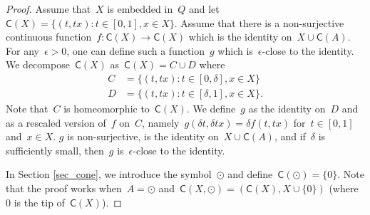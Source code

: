 \documentclass[english,11pt]{article}
\theoremstyle{plain}
\theoremstyle{remark}
\theoremstyle{definition}
\newcommand{\unit}{\odot}%
\newcommand{\C}[1]{\mathsf{C}(#1)}%
\begin{document}
\begin{proof}
Assume that~$X$ is embedded in~$Q$ and let~$\C{X}=\{(t,t x):t\in[0,1],x\in X\}$. Assume that there is a non-surjective continuous function~$f:\C{X}\to\C{X}$ which is the identity on~$X\cup\C{A}$. For any~$\epsilon>0$, one can define such a function~$g$ which is~$\epsilon$-close to the identity. We decompose~$\C{X}$ as~$\C{X}=C\cup D$ where
\begin{align*}
C&=\{(t,tx):t\in[0,\delta],x\in X\}\\
D&=\{(t,tx):t\in[\delta,1],x\in X\}.
\end{align*}
Note that~$C$ is homeomorphic to~$\C{X}$. We define~$g$ as the identity on~$D$ and as a rescaled version of~$f$ on~$C$, namely~$g(\delta t,\delta tx)=\delta f(t,tx)$ for~$t\in [0,1]$ and~$x\in X$. $g$ is non-surjective, is the identity on~$X\cup\C{A}$, and if~$\delta$ is sufficiently small, then~$g$ is~$\epsilon$-close to the identity.

In Section \ref{sec_cone}, we introduce the symbol~$\unit$ and define~$\C{\unit}=\{0\}$. Note that the proof works when~$A=\unit$ and~$\C{X,\unit}=(\C{X},X\cup \{0\})$ (where~$0$ is the tip of~$\C{X}$).
\end{proof}
\end{document}

